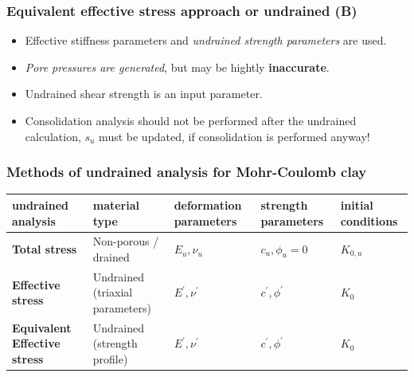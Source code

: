 \documentclass[notes]{beamer}
\begin{document}
\begin{frame}
\frametitle{Equivalent effective stress approach or undrained (B)}
\begin{itemize}
	\item Effective stiffness parameters and \textit{undrained strength parameters }are used.
	\item \textit{Pore pressures are generated}, but may be hightly \textbf{inaccurate}.
	\item Undrained shear strength is an input parameter.
	\item Consolidation analysis should not be performed after the undrained calculation, $s_u$ must be updated, if consolidation is performed anyway!
\end{itemize}
\end{frame}


\begin{frame}
\frametitle{Methods of undrained analysis for Mohr-Coulomb clay}
\begin{table}
	\begin{tabularx}{\textwidth}{XXXXX}
		\toprule
		\textbf{undrained analysis}          & \textbf{material type} & \textbf{deformation parameters} & \textbf{strength parameters} & \textbf{initial conditions} \\
		\midrule
		\textbf{Total stress}                           & Non-porous / drained   & $E_u, \nu_u$                    & $c_u, \phi_u = 0$            & $K_{0,u}$                   \\
		\midrule 
		\textbf{Effective stress} & Undrained (triaxial parameters)             & $E^\prime, \nu^\prime$          & $c^\prime, \phi^\prime$      & $K_0$                       \\
		\midrule
		\textbf{Equivalent Effective stress}    & Undrained (strength profile)           & $E^\prime, \nu^\prime$          & $c^\prime, \phi^\prime$      & $K_0$ \\    
		\bottomrule                 
	\end{tabularx}
\end{table}
\end{frame}
\end{document}
